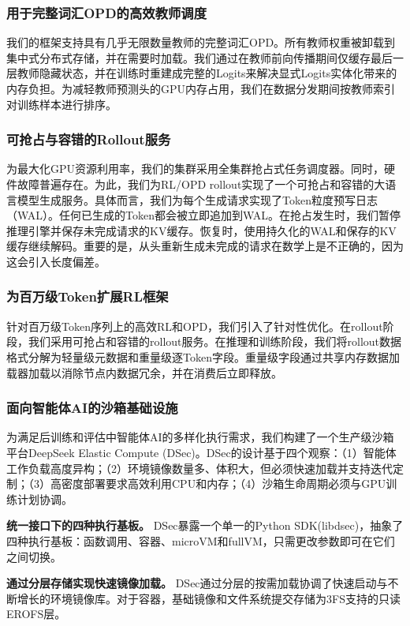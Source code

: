 \documentclass[11pt,a4paper]{article}
\begin{document}
\subsubsection{用于完整词汇OPD的高效教师调度}
我们的框架支持具有几乎无限数量教师的完整词汇OPD。所有教师权重被卸载到集中式分布式存储，并在需要时加载。我们通过在教师前向传播期间仅缓存最后一层教师隐藏状态，并在训练时重建成完整的Logits来解决显式Logits实体化带来的内存负担。为减轻教师预测头的GPU内存占用，我们在数据分发期间按教师索引对训练样本进行排序。

\subsubsection{可抢占与容错的Rollout服务}
为最大化GPU资源利用率，我们的集群采用全集群抢占式任务调度器。同时，硬件故障普遍存在。为此，我们为RL/OPD rollout实现了一个可抢占和容错的大语言模型生成服务。具体而言，我们为每个生成请求实现了Token粒度预写日志（WAL）。任何已生成的Token都会被立即追加到WAL。在抢占发生时，我们暂停推理引擎并保存未完成请求的KV缓存。恢复时，使用持久化的WAL和保存的KV缓存继续解码。重要的是，从头重新生成未完成的请求在数学上是不正确的，因为这会引入长度偏差。

\subsubsection{为百万级Token扩展RL框架}
针对百万级Token序列上的高效RL和OPD，我们引入了针对性优化。在rollout阶段，我们采用可抢占和容错的rollout服务。在推理和训练阶段，我们将rollout数据格式分解为轻量级元数据和重量级逐Token字段。重量级字段通过共享内存数据加载器加载以消除节点内数据冗余，并在消费后立即释放。

\subsubsection{面向智能体AI的沙箱基础设施}
为满足后训练和评估中智能体AI的多样化执行需求，我们构建了一个生产级沙箱平台DeepSeek Elastic Compute (DSec)。DSec的设计基于四个观察：（1）智能体工作负载高度异构；（2）环境镜像数量多、体积大，但必须快速加载并支持迭代定制；（3）高密度部署要求高效利用CPU和内存；（4）沙箱生命周期必须与GPU训练计划协调。

\textbf{统一接口下的四种执行基板。} DSec暴露一个单一的Python SDK(libdsec)，抽象了四种执行基板：函数调用、容器、microVM和fullVM，只需更改参数即可在它们之间切换。

\textbf{通过分层存储实现快速镜像加载。} DSec通过分层的按需加载协调了快速启动与不断增长的环境镜像库。对于容器，基础镜像和文件系统提交存储为3FS支持的只读EROFS层。
\end{document}
